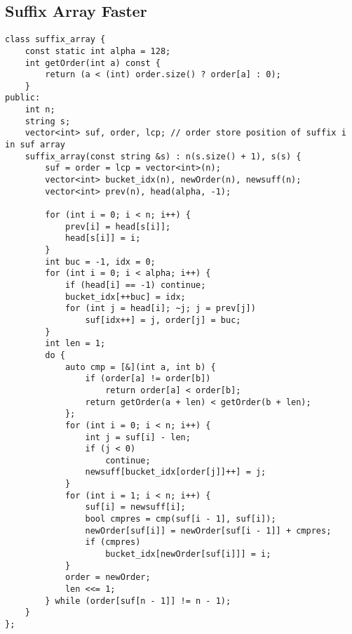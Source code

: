 \documentclass{article}
\begin{document}
{\subsection{Suffix Array Faster}
\begin{verbatim}
class suffix_array {  
    const static int alpha = 128;  
    int getOrder(int a) const {  
        return (a < (int) order.size() ? order[a] : 0);  
    }  
public:  
    int n;  
    string s;  
    vector<int> suf, order, lcp; // order store position of suffix i in suf array  
    suffix_array(const string &s) : n(s.size() + 1), s(s) {  
        suf = order = lcp = vector<int>(n);  
        vector<int> bucket_idx(n), newOrder(n), newsuff(n);  
        vector<int> prev(n), head(alpha, -1);  
          
        for (int i = 0; i < n; i++) {  
            prev[i] = head[s[i]];  
            head[s[i]] = i;  
        }  
        int buc = -1, idx = 0;  
        for (int i = 0; i < alpha; i++) {  
            if (head[i] == -1) continue;  
            bucket_idx[++buc] = idx;  
            for (int j = head[i]; ~j; j = prev[j])  
                suf[idx++] = j, order[j] = buc;  
        }  
        int len = 1;  
        do {  
            auto cmp = [&](int a, int b) {  
                if (order[a] != order[b])  
                    return order[a] < order[b];  
                return getOrder(a + len) < getOrder(b + len);  
            };  
            for (int i = 0; i < n; i++) {  
                int j = suf[i] - len;  
                if (j < 0)  
                    continue;  
                newsuff[bucket_idx[order[j]]++] = j;  
            }  
            for (int i = 1; i < n; i++) {  
                suf[i] = newsuff[i];  
                bool cmpres = cmp(suf[i - 1], suf[i]);  
                newOrder[suf[i]] = newOrder[suf[i - 1]] + cmpres;  
                if (cmpres)  
                    bucket_idx[newOrder[suf[i]]] = i;  
            }  
            order = newOrder;  
            len <<= 1;  
        } while (order[suf[n - 1]] != n - 1);  
    }  
};
\end{verbatim}

}
\end{document}
